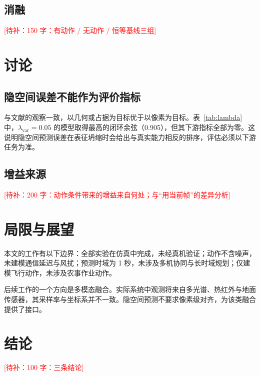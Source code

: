 \documentclass[12pt,a4paper]{ctexart}
\newcommand{\todo}[1]{\textcolor{red}{[待补：#1]}}
\let\origcite\cite
\renewcommand{\cite}[2][]{\nobreak\mbox{\origcite[#1]{#2}}}
\begin{document}
\subsection{消融}
\todo{150 字：有动作 / 无动作 / 恒等基线三组}

\section{讨论}

\subsection{隐空间误差不能作为评价指标}
与文献\cite{liu2026mad}的观察一致，以几何或占据为目标优于以像素为目标。表~\ref{tab:lambda} 中，$\lambda_{\text{var}}=0.05$ 的模型取得最高的闭环余弦（0.905），但其下游指标全部为零。这说明隐空间预测误差在表征坍缩时会给出与真实能力相反的排序，评估必须以下游任务为准。

\subsection{增益来源}
\todo{200 字：动作条件带来的增益来自何处；与``用当前帧''的差异分析}

\section{局限与展望}

本文的工作有以下边界：全部实验在仿真中完成，未经真机验证；动作不含噪声，未建模通信延迟与风扰；预测时域为 1 秒，未涉及多机协同与长时域规划；仅建模飞行动作，未涉及农事作业动作。

后续工作的一个方向是多模态融合。实际系统中观测将来自多光谱、热红外与地面传感器，其采样率与坐标系并不一致。隐空间预测不要求像素级对齐，为该类融合提供了接口。

\section{结论}

\todo{100 字：三条结论}

\begingroup\small


\endgroup
\end{document}
